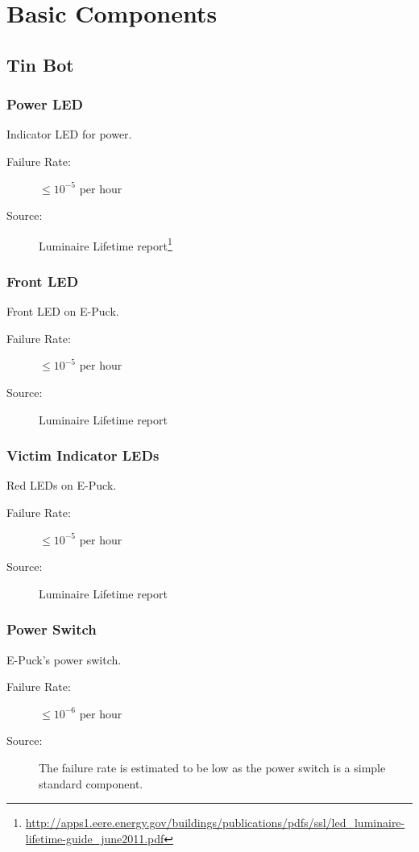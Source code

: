 \documentclass[a4paper,parskip,headheight=38pt]{scrartcl} %
\begin{document}
\section{Basic Components}

\subsection{Tin Bot} %

\subsubsection{Power LED}
Indicator LED for power.
\begin{description}
	\item[Failure Rate:] $\leq 10^{-5}$ per hour
	\item[Source:] Luminaire Lifetime report\footnote{\url{http://apps1.eere.energy.gov/buildings/publications/pdfs/ssl/led\_luminaire-lifetime-guide\_june2011.pdf}}
\end{description}

\subsubsection{Front LED}
Front LED on E-Puck.
\begin{description}
	\item[Failure Rate:] $\leq 10^{-5}$ per hour
	\item[Source:] Luminaire Lifetime report
\end{description}

\subsubsection{Victim Indicator LEDs}
Red LEDs on E-Puck.
\begin{description}
	\item[Failure Rate:] $\leq 10^{-5}$ per hour
	\item[Source:] Luminaire Lifetime report
\end{description}

\subsubsection{Power Switch}
E-Puck's power switch.
\begin{description}
	\item[Failure Rate:] $\leq 10^{-6}$ per hour
	\item[Source:] The failure rate is estimated to be low as the power switch is a simple standard component.
\end{description}
\end{document}
